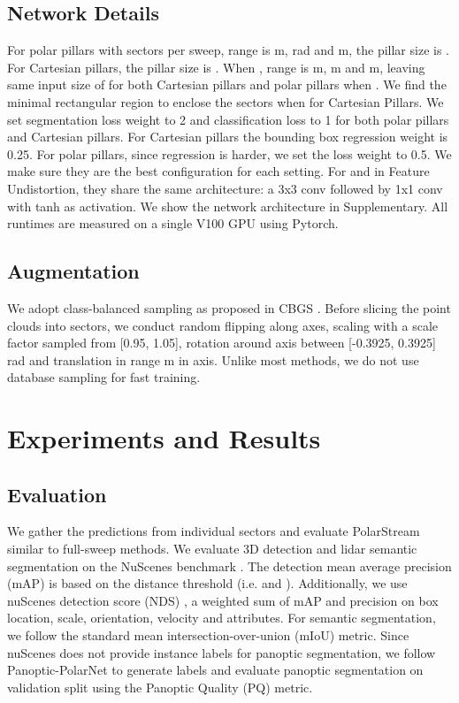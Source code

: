 \documentclass{article}
\begin{document}
\subsection{Network Details}\vspace{-2mm}
For polar pillars with  sectors per sweep,  range is m,  rad and m, the pillar size is . For Cartesian pillars, the pillar size is . When ,  range is m,  m and m, leaving same input size of  for both Cartesian pillars and polar pillars when . We find the minimal rectangular region to enclose the sectors when  for Cartesian Pillars. We set segmentation loss weight to 2 and classification loss to 1 for both polar pillars and Cartesian pillars. For Cartesian pillars the bounding box regression weight is 0.25. For polar pillars, since regression is harder, we set the loss weight to 0.5. We make sure they are the best configuration for each setting. For  and  in Feature Undistortion, they share the same architecture: a 3x3 conv followed by 1x1 conv with tanh as activation. We show the network architecture in Supplementary. All runtimes are measured on a single V100 GPU using Pytorch.

\vspace{-3mm}\subsection{Augmentation}\vspace{-2mm}
We adopt class-balanced sampling as proposed in CBGS \cite{zhu2019class}. Before slicing the point clouds into sectors, we conduct random flipping along  axes, scaling with a scale factor sampled from [0.95, 1.05], rotation around  axis between [-0.3925, 0.3925] rad and translation in range  m in  axis. Unlike most methods, we do not use database sampling\cite{yan2018second} for fast training.
\vspace{-3mm}\section{Experiments and Results}\vspace{-3mm}
\label{results}
\subsection{Evaluation}\vspace{-2mm}
We gather the predictions from individual sectors and evaluate PolarStream similar to full-sweep methods. We evaluate 3D detection and lidar semantic segmentation on the NuScenes benchmark \cite{caesar2019nuscenes}. The detection mean average precision (mAP) is based on the distance threshold (i.e.  and ). Additionally, we use nuScenes detection score (NDS) \cite{caesar2019nuscenes}, a weighted sum of mAP and precision on box location, scale, orientation, velocity and attributes. For semantic segmentation, we follow the standard mean intersection-over-union (mIoU) metric. Since nuScenes does not provide instance labels for panoptic segmentation, we follow Panoptic-PolarNet \cite{zhou2021panoptic} to generate labels and evaluate panoptic segmentation on validation split using the Panoptic Quality (PQ) metric.
\end{document}
